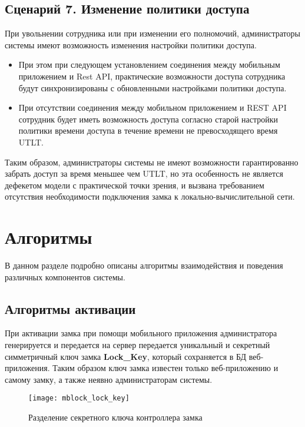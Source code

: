 \subsection{Сценарий 7. Изменение политики доступа} \label{subsect2_3_7}

При увольнении сотрудника или при изменении его полномочий, администраторы системы имеют возможность изменения настройки политики доступа. 

\begin{itemize}
	\item При этом при следующем установлением соединения между мобильным приложением и Rest API, практические возможности доступа сотрудника будут синхронизированы с обновленными настройками политики доступа.
	\item При отсутствии соединения между мобильном приложением и REST API сотрудник будет иметь возможность доступа согласно старой настройки политики времени доступа в течение времени не превосходящего время UTLT.
\end{itemize}

Таким образом, администраторы системы не имеют возможности гарантированно забрать доступ за время меньшее чем UTLT, но эта особенность не является дефекетом модели с практической точки зрения, и вызвана требованием отсутствия необходимости подключения замка к локально-вычислительной сети.

\section{Алгоритмы}	\label{sect2_4}

В данном разделе подробно описаны алгоритмы взаимодействия и поведения различных компонентов системы.

\subsection{Алгоритмы активации} \label{subsect2_4_1}

При активации замка при помощи мобильного приложения администратора генерируется и передается на сервер передается уникальный и секретный симметричный ключ замка \textbf{Lock\_Key}, который сохраняется в БД веб-приложения. Таким образом ключ замка известен только веб-приложению и самому замку, а также неявно администраторам системы.

\begin{figure}[ht] %
	\centering
	\texttt{[image: mblock\_lock\_key]}\\ %
	\caption{Разделение секретного ключа контроллера замка}%
	\label{mblock_lock_key}%
\end{figure}

